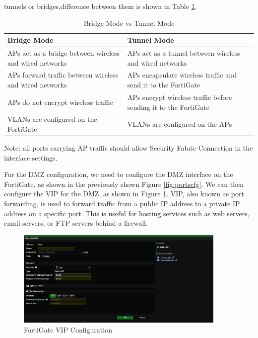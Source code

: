 \documentclass[12pt]{report}
\begin{document}
tunnels or bridges,difference between them is shown in Table \ref{tab:bridgevstunnel}.
\begin{table}[h]
    \centering
    \begin{tabular}{|>{\centering\arraybackslash}m{5cm}|>{\centering\arraybackslash}m{5cm}|}
        \hline
        \textbf{Bridge Mode} & \textbf{Tunnel Mode} \\
        \hline
        APs act as a bridge between wireless and wired networks & APs act as a tunnel between wireless and wired networks \\
        \hline
        APs forward traffic between wireless and wired networks & APs encapsulate wireless traffic and send it to the FortiGate \\
        \hline
        APs do not encrypt wireless traffic & APs encrypt wireless traffic before sending it to the FortiGate \\
        \hline
        VLANs are configured on the FortiGate & VLANs are configured on the APs \\
        \hline
    \end{tabular}
    \caption{Bridge Mode vs Tunnel Mode}
    \label{tab:bridgevstunnel}
\end{table}
Note: all ports carrying AP traffic should allow Security Fabric Connection in the interface settings.

For the DMZ configuration, we need to configure the DMZ interface on the FortiGate, as shown in the previously shown Figure \ref{fig:portscfg}. We can then configure the VIP for the DMZ, as shown in Figure \ref{fig:vip}. VIP, also known as port forwarding, is used to forward traffic from a public IP address to a private IP address on a specific port. This is useful for hosting services such as web servers, email servers, or FTP servers behind a firewall.
\begin{figure}
    \centering
    \includegraphics[width=0.9\textwidth]{images/Implementation/vip.png}
    \caption{FortiGate VIP Configuration}
    \label{fig:vip}
\end{figure}
\end{document}
